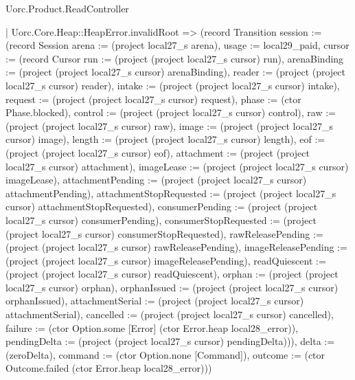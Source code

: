 \begin{lexlean}{Uorc.Product.ReadController}
\begin{semanticmodule}
{    | Uorc.Core.Heap::HeapError.invalidRoot => (record Transition {session := (record Session {arena := (project local27_s arena), usage := local29_paid, cursor := (record Cursor {run := (project (project local27_s cursor) run), arenaBinding := (project (project local27_s cursor) arenaBinding), reader := (project (project local27_s cursor) reader), intake := (project (project local27_s cursor) intake), request := (project (project local27_s cursor) request), phase := (ctor Phase.blocked), control := (project (project local27_s cursor) control), raw := (project (project local27_s cursor) raw), image := (project (project local27_s cursor) image), length := (project (project local27_s cursor) length), eof := (project (project local27_s cursor) eof), attachment := (project (project local27_s cursor) attachment), imageLease := (project (project local27_s cursor) imageLease), attachmentPending := (project (project local27_s cursor) attachmentPending), attachmentStopRequested := (project (project local27_s cursor) attachmentStopRequested), consumerPending := (project (project local27_s cursor) consumerPending), consumerStopRequested := (project (project local27_s cursor) consumerStopRequested), rawReleasePending := (project (project local27_s cursor) rawReleasePending), imageReleasePending := (project (project local27_s cursor) imageReleasePending), readQuiescent := (project (project local27_s cursor) readQuiescent), orphan := (project (project local27_s cursor) orphan), orphanIssued := (project (project local27_s cursor) orphanIssued), attachmentSerial := (project (project local27_s cursor) attachmentSerial), cancelled := (project (project local27_s cursor) cancelled), failure := (ctor Option.some [Error] (ctor Error.heap local28_error)), pendingDelta := (project (project local27_s cursor) pendingDelta)})}), delta := (zeroDelta), command := (ctor Option.none [Command]), outcome := (ctor Outcome.failed (ctor Error.heap local28_error))})
}
\end{semanticmodule}
\end{lexlean}
